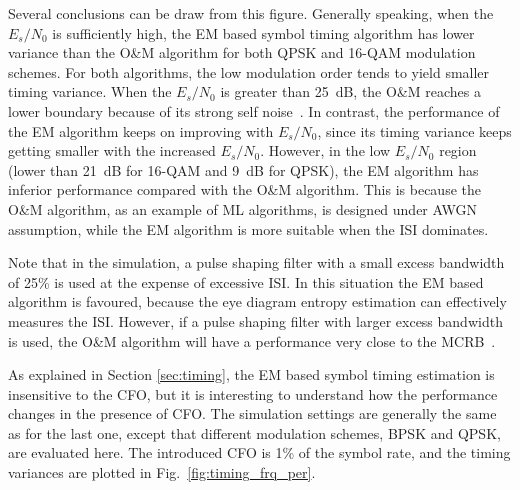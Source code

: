 \documentclass[12pt, draftclsnofoot, onecolumn]{IEEEtran}
\begin{document}
Several conclusions can be draw from this figure.
Generally speaking, when the  \(E_s/N_0\) is sufficiently high, the EM based symbol timing algorithm has lower variance than the O\&M algorithm for both QPSK and 16-QAM modulation schemes.
For both algorithms, the low modulation order tends to yield smaller timing variance.
When the \(E_s/N_0\) is greater than 25~dB, the O\&M reaches a lower boundary because of its strong self noise~\cite{mengali1997synchronization}. 
% 
% 
In contrast, the performance of the EM algorithm keeps on improving with \(E_s/N_0\), since its timing variance keeps getting smaller with the increased \(E_s/N_0\).
However, in the low \(E_s/N_0\) region (lower than 21~dB for 16-QAM and 9~dB for QPSK), the EM algorithm has inferior performance compared with the O\&M algorithm.
This is because the O\&M algorithm, as an example of ML algorithms, is designed under AWGN assumption, while the EM algorithm is more suitable when the ISI dominates.


Note that in the simulation, a pulse shaping filter with a small excess bandwidth of 25\% is used at the expense of excessive ISI.
In this situation the EM based algorithm is favoured, because the eye diagram entropy estimation can effectively measures the ISI.
However, if a pulse shaping filter with larger excess bandwidth is used, the O\&M algorithm will have a performance very close to the MCRB~\cite{mengali1997synchronization}.
% 
% 

As explained in Section \ref{sec:timing}, the EM based symbol timing estimation is insensitive to the CFO, but it is interesting to understand how the performance changes in the presence of CFO. 
The simulation settings are generally the same as for the last one, except that different modulation schemes, BPSK and QPSK,  are evaluated here.
The introduced CFO is 1\% of the symbol rate, and the timing variances are plotted in Fig.~\ref{fig:timing_frq_per}.
\end{document}
